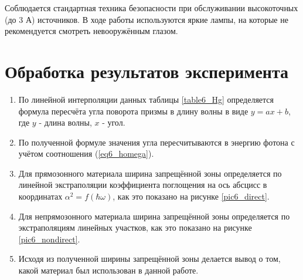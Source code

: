 Соблюдается стандартная техника безопасности при обслуживании высокоточных (до 3 А) источников. В ходе работы используются яркие лампы, на которые не рекомендуется смотреть невооружённым глазом.

\section{Обработка результатов эксперимента}
\begin{enumerate}
\item По линейной интерполяции данных таблицы \ref{table6_Hg} определяется формула пересчёта угла поворота призмы в длину волны в виде $y = a x + b$, где $y$ - длина волны, $x$ - угол.
\item По полученной формуле значения угла пересчитываются в энергию фотона с учётом соотношения (\ref{eq6_homega}).
\item Для прямозонного материала ширина запрещённой зоны определяется по линейной экстраполяции коэффициента поглощения на ось абсцисс в координатах $\alpha^2 = f(\hbar \omega)$, как это показано на рисунке \ref{pic6_direct}.
\item Для непрямозонного материала ширина запрещённой зоны определяется по экстраполяциям линейных участков, как это показано на рисунке \ref{pic6_nondirect}.
\item Исходя из полученной ширины запрещённой зоны делается вывод о том, какой материал был использован в данной работе.
\end{enumerate}

